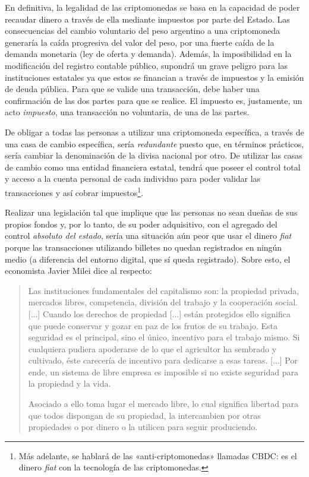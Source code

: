 \documentclass[12pt,a4paper,twoside]{book}
\begin{document}
En definitiva, la legalidad de las criptomonedas se basa en la capacidad de poder recaudar dinero a través de ella mediante impuestos por parte del Estado. Las consecuencias del cambio voluntario del peso argentino a una criptomoneda generaría la caída progresiva del valor del peso, por una fuerte caída de la demanda monetaria (ley de oferta y demanda). Además, la imposibilidad en la modificación del registro contable público, supondrá un grave peligro para las instituciones estatales ya que estos se financian a través de impuestos y la emisión de deuda pública. Para que se valide una transacción, debe haber una confirmación de las dos partes para que se realice. El impuesto es, justamente, un acto \textit{impuesto}, una transacción no voluntaria, de una de las partes.

De obligar a todas las personas a utilizar una criptomoneda específica, a través de una casa de cambio específica, sería \textit{redundante} puesto que, en términos prácticos, sería cambiar la denominación de la divisa nacional por otro. De utilizar las casas de cambio como una entidad financiera estatal, tendrá que poseer el control total y acceso a la cuenta personal de cada individuo para poder validar las transacciones y así cobrar impuestos\footnote{Más adelante, se hablará de las «anti-criptomonedas» llamadas CBDC: es el dinero \textit{fiat} con la tecnología de las criptomonedas.}.

Realizar una legislación tal que implique que las personas no sean dueñas de sus propios fondos y, por lo tanto, de su poder adquisitivo, con el agregado del control \textit{absoluto del estado}, sería una situación aún peor que usar el dinero \textit{fiat} porque las transacciones utilizando billetes no quedan registrados en ningún medio (a diferencia del entorno digital, que sí queda registrado). Sobre esto, el economista Javier Milei dice al respecto:

\begin{quotation}
Las instituciones fundamentales del capitalismo son: la propiedad privada, mercados libres, competencia, división del trabajo y la cooperación social. [...] Cuando los derechos de propiedad [...] están protegidos ello significa que puede conservar y gozar en paz de los frutos de su trabajo. Esta seguridad es el principal, sino el único, incentivo para el trabajo mismo. Si cualquiera pudiera apoderarse de lo que el agricultor ha sembrado y cultivado, éste carecería de incentivo para dedicarse a esas tareas. [...] Por ende, un sistema de libre empresa es imposible si no existe seguridad para la propiedad y la vida.

Asociado a ello toma lugar el mercado libre, lo cual significa libertad para que todos dispongan de su propiedad, la intercambien por otras propiedades o por dinero o la utilicen para seguir produciendo. \cite{cronista:capitalismo}
\end{quotation}
\end{document}
